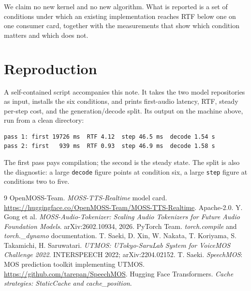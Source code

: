 \documentclass[11pt]{article}
\begin{document}
We claim no new kernel and no new algorithm. What is reported is a set of conditions under which an existing
implementation reaches RTF below one on one consumer card, together with the measurements that show which
condition matters and which does not.

\section{Reproduction}

A self-contained script accompanies this note. It takes the two model repositories as input, installs the six
conditions, and prints first-audio latency, RTF, steady per-step cost, and the generation/decode split. Its output
on the machine above, run from a clean directory:

\begin{verbatim}
pass 1: first 19726 ms  RTF 4.12  step 46.5 ms  decode 1.54 s
pass 2: first   939 ms  RTF 0.93  step 46.9 ms  decode 1.58 s
\end{verbatim}

The first pass pays compilation; the second is the steady state. The split is also the diagnostic: a large
\texttt{decode} figure points at condition six, a large \texttt{step} figure at conditions two to five.

\begin{thebibliography}{9}
 OpenMOSS-Team. \emph{MOSS-TTS-Realtime} model card.
\url{https://huggingface.co/OpenMOSS-Team/MOSS-TTS-Realtime}. Apache-2.0.
 Y. Gong et al. \emph{MOSS-Audio-Tokenizer: Scaling Audio Tokenizers for Future Audio
Foundation Models}. arXiv:2602.10934, 2026.
 PyTorch Team. \emph{torch.compile} and \emph{torch.\_dynamo} documentation.
 T. Saeki, D. Xin, W. Nakata, T. Koriyama, S. Takamichi, H. Saruwatari.
\emph{UTMOS: UTokyo-SaruLab System for VoiceMOS Challenge 2022}. INTERSPEECH 2022; arXiv:2204.02152.
 T. Saeki. \emph{SpeechMOS}: MOS prediction toolkit implementing UTMOS.
\url{https://github.com/tarepan/SpeechMOS}.
 Hugging Face Transformers. \emph{Cache strategies: StaticCache and cache\_position}.
\end{thebibliography}
\end{document}
